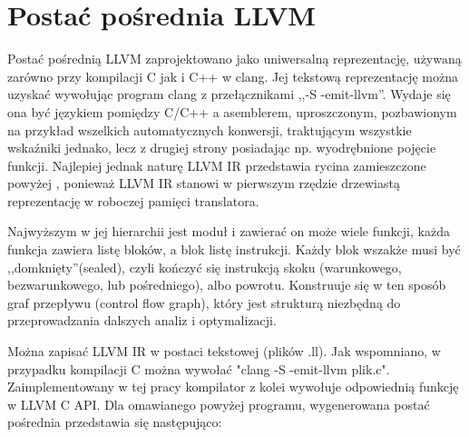 \section{Postać pośrednia LLVM}
Postać pośrednią LLVM zaprojektowano jako uniwersalną reprezentację, używaną zarówno przy kompilacji C jak i C++ w clang. Jej tekstową reprezentację można uzyskać wywołując program clang z przełącznikami ,,-S -emit-llvm''. Wydaje się ona być językiem pomiędzy C/C++ a asemblerem, uproszczonym, pozbawionym na przykład wszelkich automatycznych konwersji, traktującym wszystkie wskaźniki jednako, lecz z drugiej strony posiadając np. wyodrębnione pojęcie funkcji. Najlepiej jednak naturę LLVM IR przedstawia rycina zamieszczone powyżej , ponieważ LLVM IR stanowi w pierwszym rzędzie drzewiastą reprezentację w roboczej pamięci translatora.

Najwyższym w jej hierarchii jest moduł i zawierać on może wiele funkcji, każda funkcja zawiera listę bloków, a blok listę instrukcji. Każdy blok wszakże musi być ,,domknięty''(sealed), czyli kończyć się instrukcją skoku (warunkowego, bezwarunkowego, lub pośredniego), albo powrotu. Konstruuje się w ten sposób graf przepływu (control flow graph), który jest strukturą niezbędną do przeprowadzania dalszych analiz i optymalizacji.\cite{llvm_lang_ref}

Można zapisać LLVM IR w postaci tekstowej (plików .ll). Jak wspomniano, w przypadku kompilacji C można wywołać "clang -S -emit-llvm plik.c". Zaimplementowany w tej pracy kompilator z kolei wywołuje odpowiednią funkcję w LLVM C API. Dla omawianego powyżej programu, wygenerowana postać pośrednia przedstawia się następująco:

